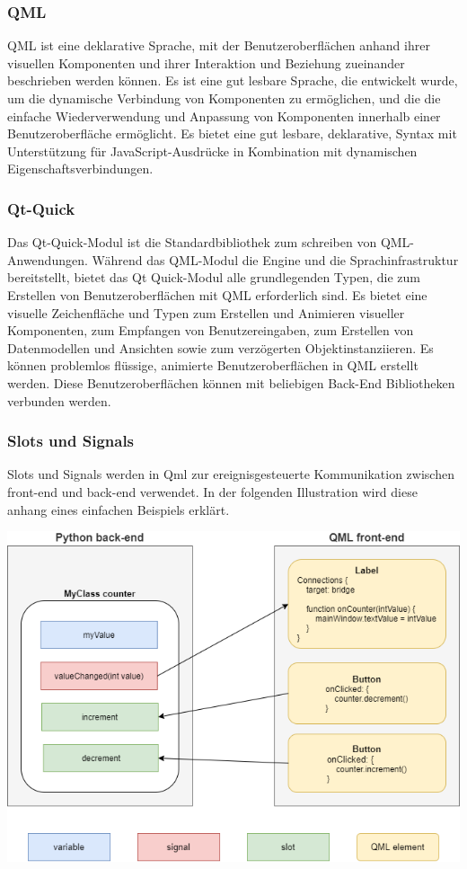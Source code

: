 \subsubsection{QML}
QML ist eine deklarative Sprache, mit der Benutzeroberflächen anhand ihrer visuellen Komponenten und ihrer Interaktion und Beziehung zueinander beschrieben werden können. Es ist eine gut lesbare Sprache, die entwickelt wurde, um die dynamische Verbindung von Komponenten zu ermöglichen, und die die einfache Wiederverwendung und Anpassung von Komponenten innerhalb einer Benutzeroberfläche ermöglicht. Es bietet eine gut lesbare, deklarative, Syntax mit Unterstützung für JavaScript-Ausdrücke in Kombination mit dynamischen Eigenschaftsverbindungen.
\subsubsection{Qt-Quick}
Das Qt-Quick-Modul ist die Standardbibliothek zum schreiben von QML-Anwendungen. Während das QML-Modul die Engine und die Sprachinfrastruktur bereitstellt, bietet das Qt Quick-Modul alle grundlegenden Typen, die zum Erstellen von Benutzeroberflächen mit QML erforderlich sind. Es bietet eine visuelle Zeichenfläche und Typen zum Erstellen und Animieren visueller Komponenten, zum Empfangen von Benutzereingaben, zum Erstellen von Datenmodellen und Ansichten sowie zum verzögerten Objektinstanziieren. Es können problemlos flüssige, animierte Benutzeroberflächen in QML erstellt werden. Diese Benutzeroberflächen können mit beliebigen Back-End Bibliotheken verbunden werden.
\newpage


\subsubsection{Slots und Signals}
Slots und Signals werden in Qml zur ereignisgesteuerte Kommunikation zwischen front-end und back-end verwendet. In der folgenden Illustration wird diese anhang eines einfachen Beispiels erklärt.

\begin{center}
\includegraphics[scale=0.5]{figures/hcis/signals_slots.png}
\end{center}

